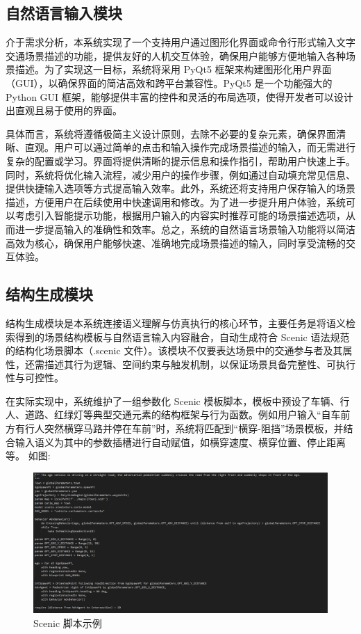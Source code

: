 \subsection{自然语言输入模块}
介于需求分析，本系统实现了一个支持用户通过图形化界面或命令行形式输入文字交通场景描述的功能，提供友好的人机交互体验，确保用户能够方便地输入各种场景描述。为了实现这一目标，系统将采用 PyQt5 框架来构建图形化用户界面（GUI），以确保界面的简洁高效和跨平台兼容性。PyQt5 是一个功能强大的 Python GUI 框架，能够提供丰富的控件和灵活的布局选项，使得开发者可以设计出直观且易于使用的界面。

具体而言，系统将遵循极简主义设计原则，去除不必要的复杂元素，确保界面清晰、直观。用户可以通过简单的点击和输入操作完成场景描述的输入，而无需进行复杂的配置或学习。界面将提供清晰的提示信息和操作指引，帮助用户快速上手。同时，系统将优化输入流程，减少用户的操作步骤，例如通过自动填充常见信息、提供快捷输入选项等方式提高输入效率。此外，系统还将支持用户保存输入的场景描述，方便用户在后续使用中快速调用和修改。为了进一步提升用户体验，系统可以考虑引入智能提示功能，根据用户输入的内容实时推荐可能的场景描述选项，从而进一步提高输入的准确性和效率。总之，系统的自然语言场景输入功能将以简洁高效为核心，确保用户能够快速、准确地完成场景描述的输入，同时享受流畅的交互体验。
\subsection{结构生成模块}

结构生成模块是本系统连接语义理解与仿真执行的核心环节，主要任务是将语义检索得到的场景结构模板与自然语言输入内容融合，自动生成符合 Scenic 语法规范的结构化场景脚本（.scenic 文件）。该模块不仅要表达场景中的交通参与者及其属性，还需描述其行为逻辑、空间约束与触发机制，以保证场景具备完整性、可执行性与可控性。

在实际实现中，系统维护了一组参数化 Scenic 模板脚本，模板中预设了车辆、行人、道路、红绿灯等典型交通元素的结构框架与行为函数。例如用户输入“自车前方有行人突然横穿马路并停在车前”时，系统将匹配到“横穿-阻挡”场景模板，并结合输入语义为其中的参数插槽进行自动赋值，如横穿速度、横穿位置、停止距离等。
如图:
\begin{figure}[H]
	\centering
	\includegraphics[width=1.0\textwidth]{images/scenic脚本示例1.png}
	\caption{Scenic 脚本示例}
	\label{fig:scenic-example1}
\end{figure}



